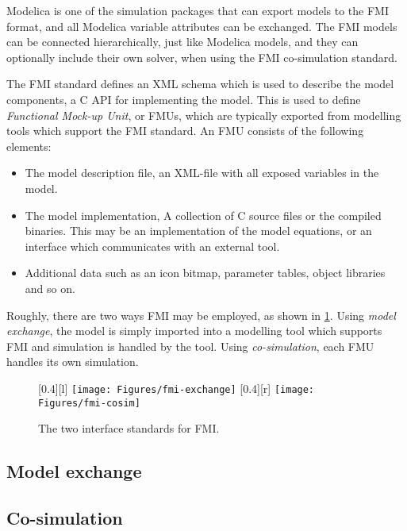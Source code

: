 \documentclass[\rootfolder/main.tex]{subfiles}
\begin{document}
Modelica is one of the simulation packages that can export models to the FMI format, and all Modelica variable attributes can be exchanged.
The FMI models can be connected hierarchically, just like Modelica models, and they can optionally include their own solver, when using the FMI co-simulation standard.

The FMI standard defines an XML schema which is used to describe the model components, a C API for implementing the model.
This is used to define \emph{Functional Mock-up Unit}, or FMUs, which are typically exported from modelling tools which support the FMI standard.
An FMU consists of the following elements:

\begin{itemize}
    \item The model description file, an XML-file with all exposed variables in the model.
    \item The model implementation, A collection of C source files or the compiled binaries.
        This may be an implementation of the model equations, or an interface which communicates with an external tool.
    \item Additional data such as an icon bitmap, parameter tables, object libraries and so on.
\end{itemize}

Roughly, there are two ways FMI may be employed, as shown in \cref{fig:fmi}.
Using \emph{model exchange}, the model is simply imported into a modelling tool which supports FMI and simulation is handled by the tool.
Using \emph{co-simulation}, each FMU handles its own simulation.

\begin{figure}[ht]
    \centering
    [0.4\columnwidth][l]
        {
            \texttt{[image: Figures/fmi-exchange]}
        }
        [0.4\columnwidth][r]
        {
            \texttt{[image: Figures/fmi-cosim]}
        }
    \caption{The two interface standards for FMI.\label{fig:fmi}}
\end{figure}

\subsection{Model exchange}

\subsection{Co-simulation}
\end{document}
